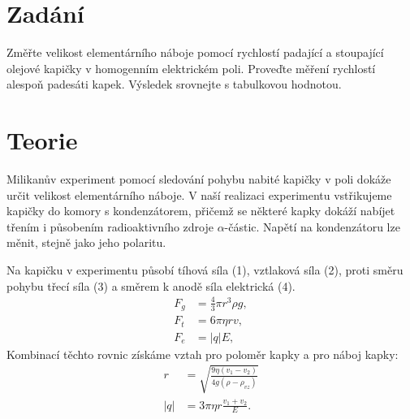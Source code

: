\documentclass[czech,11pt,a4paper]{article}
\begin{document}
	\begin{multicols}{2}
		\section{Zadání}
	
Změřte velikost elementárního náboje pomocí rychlostí padající a stoupající olejové kapičky
v homogenním elektrickém poli. Proveďte měření rychlostí alespoň padesáti kapek. Výsledek
srovnejte s tabulkovou hodnotou.\\

		\section{Teorie}
		
		Milikanův experiment pomocí sledování pohybu nabité kapičky v poli dokáže určit velikost elementárního náboje. V naší realizaci experimentu vstřikujeme kapičky do komory s kondenzátorem, přičemž se některé kapky dokáží nabíjet třením i působením radioaktivního zdroje $\alpha$-částic. Napětí na kondenzátoru lze měnit, stejně jako jeho polaritu.
		
		Na kapičku v experimentu působí tíhová síla (1), vztlaková síla (2), proti směru pohybu třecí síla (3) a směrem k anodě síla elektrická (4).
		\begin{align}
			F_{g}&=\frac{4}{3} \pi r^{3} \rho g,\\
			F_{t}&=6 \pi \eta r v,\\
			F_{e}&=|q| E \text {, }
		\end{align}
		Kombinací těchto rovnic získáme vztah pro poloměr kapky a pro náboj kapky:
		\begin{align}
			r&=\sqrt{\frac{9 \eta\left(v_{1}-v_{2}\right)}{4 g\left(\rho-\rho_{v z}\right)} }\\
			|q|&=3 \pi \eta r \frac{v_{1}+v_{2}}{E} .			
		\end{align}
		

\end{multicols}
\end{document}
